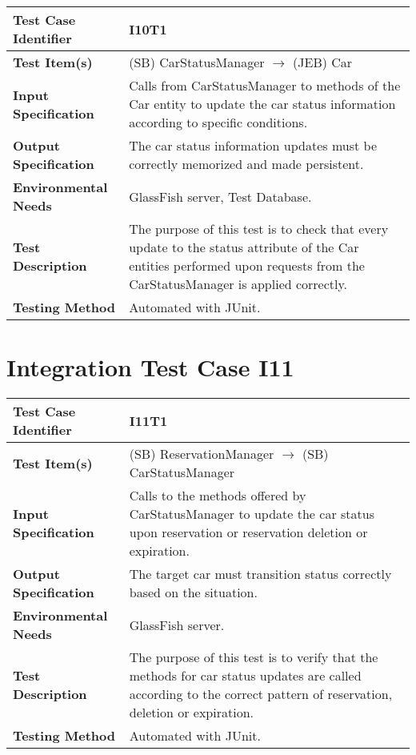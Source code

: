 \begin{longtable}{p{} | p{}}
\textbf{Test Case Identifier} & I10T1\\
\hline
\textbf{Test Item(s)} & (SB) CarStatusManager $\rightarrow$ (JEB) Car \\
\hline
\textbf{Input Specification} & Calls from CarStatusManager to methods of the Car entity to update the car status information according to specific conditions.\\
\hline
\textbf{Output Specification} & The car status information updates must be correctly memorized and made persistent. \\
\hline
\textbf{Environmental Needs} & GlassFish server, Test Database. \\
\hline
\textbf{Test Description} & The purpose of this test is to check that every update to the status attribute of the Car entities performed upon requests from the CarStatusManager is applied correctly. \\
\hline
\textbf{Testing Method} & Automated with JUnit. \\
\hline
\end{longtable}

\section{Integration Test Case I11}

\begin{longtable}{p{} | p{}}
\textbf{Test Case Identifier} & I11T1\\
\hline
\textbf{Test Item(s)} & (SB) ReservationManager $\rightarrow$ (SB) CarStatusManager \\
\hline
\textbf{Input Specification} & Calls to the methods offered by CarStatusManager to update the car status upon reservation or reservation deletion or expiration. \\
\hline
\textbf{Output Specification} & The target car must transition status correctly based on the situation. \\
\hline
\textbf{Environmental Needs} & GlassFish server. \\
\hline
\textbf{Test Description} & The purpose of this test is to verify that the methods for car status updates are called according to the correct pattern of reservation, deletion or expiration. \\
\hline
\textbf{Testing Method} & Automated with JUnit. \\
\hline
\end{longtable}

